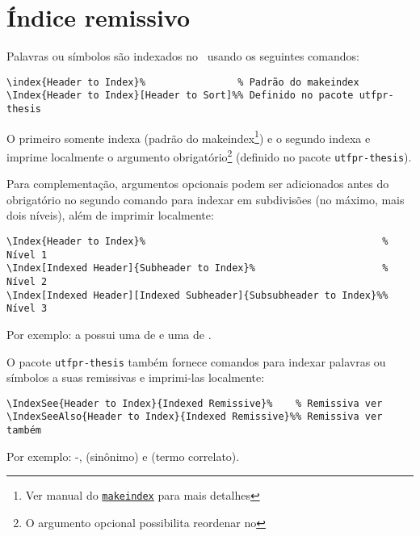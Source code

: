 \section{Índice remissivo}%
\label{sect:idx}

Palavras ou símbolos são indexados no \idxref\ usando os seguintes comandos:

\begin{snugshade}
\begin{Verbatim}
\index{Header to Index}%                % Padrão do makeindex
\Index{Header to Index}[Header to Sort]%% Definido no pacote utfpr-thesis
\end{Verbatim}
\end{snugshade}

\noindent O primeiro somente indexa (padrão do makeindex\footnote{Ver manual do \href{https://www.ctan.org/pkg/makeindex}{\texttt{makeindex}\LinkIcon} para mais detalhes}) e o segundo indexa e imprime localmente o argumento obrigatório\footnote{O argumento opcional possibilita reordenar no \idxref} (definido no pacote \texttt{utfpr-thesis}).

Para complementação, argumentos opcionais podem ser adicionados antes do obrigatório no segundo comando para indexar em subdivisões (no máximo, mais dois níveis), além de imprimir localmente:

\begin{snugshade}
\begin{Verbatim}
\Index{Header to Index}%                                         % Nível 1
\Index[Indexed Header]{Subheader to Index}%                      % Nível 2
\Index[Indexed Header][Indexed Subheader]{Subsubheader to Index}%% Nível 3
\end{Verbatim}
\end{snugshade}

\noindent Por exemplo: a  possui uma  de  e uma  de .

O pacote \texttt{utfpr-thesis} também fornece comandos para indexar palavras ou símbolos a suas remissivas e imprimi-las localmente:

\begin{snugshade}
\begin{Verbatim}
\IndexSee{Header to Index}{Indexed Remissive}%    % Remissiva ver
\IndexSeeAlso{Header to Index}{Indexed Remissive}%% Remissiva ver também
\end{Verbatim}
\end{snugshade}

\noindent Por exemplo: -,  (sinônimo) e  (termo correlato).
